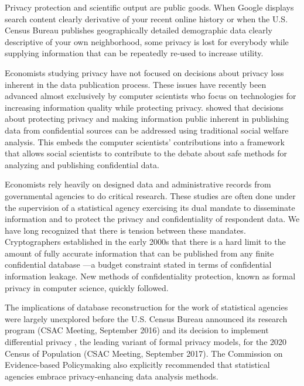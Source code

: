 

Privacy protection and scientific output are public goods. When Google displays search content clearly derivative of your recent online history or when the U.S. Census Bureau publishes geographically detailed demographic data clearly descriptive of your own neighborhood, some privacy is lost for everybody while supplying information that can be repeatedly re-used to increase utility.

Economists studying privacy have not focused on decisions about privacy loss inherent in the data publication process. These issues have recently been advanced almost exclusively by computer scientists who focus on technologies for increasing information quality while protecting privacy.
%
\citet{abowdschmutte.aer.2018} showed that decisions about protecting privacy and making information public inherent in publishing data from confidential sources can be addressed using traditional social welfare analysis.
This embeds the computer scientists' contributions into a framework that allows social scientists to contribute to the debate about safe methods for analyzing and publishing confidential data.

Economists rely heavily on designed data and administrative records from governmental agencies to do critical research.
These studies are often done under the supervision of a statistical agency exercising its dual mandate to disseminate
information and to protect the privacy and confidentiality of respondent data. We have long recognized that there is
tension between these mandates. Cryptographers established in the early 2000s that there is a hard limit to the amount
of fully accurate information that can be published from any finite confidential database \citep{Dinur:2003:RIW:773153.773173}---a
budget constraint stated in terms of confidential information leakage. New methods of
confidentiality protection, known as formal privacy in computer science, quickly followed.

The implications of database reconstruction for the work of statistical agencies were largely unexplored before the U.S. Census Bureau announced its research program (\ac{CSAC} Meeting, September 2016) and its decision to implement differential privacy \citep{Dwork2006a}, the leading variant of formal privacy models, for the 2020 Census of Population (\ac{CSAC} Meeting, September 2017). The Commission on Evidence-based Policymaking \citeyearpar{cep:promise:2017} also explicitly recommended that statistical agencies embrace privacy-enhancing data analysis methods.

